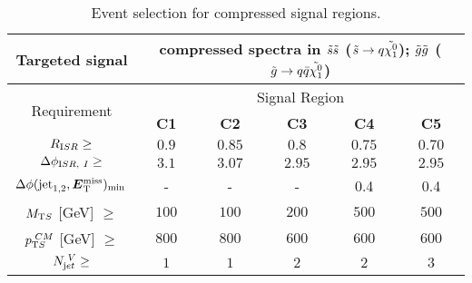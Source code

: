 {\begin{table}[tbp]
\begin{tabular}{|c|c|c|c|c|c|}
\hline
       Targeted signal & \multicolumn{5}{c|}{ compressed spectra in $\tilde{s}\tilde{s}$ ($\tilde{s} \rightarrow q \tilde{\chi^0_1}$); $\tilde{g}\tilde{g}$ ($\tilde{g} \rightarrow q\bar{q} \tilde{\chi^0_1}$) } \\
       \hline \hline
      \multirow{2}{*}{Requirement}                                             & \multicolumn{5}{c|}{Signal Region}                                                           \\
 \cline{2-6}                                                                   & \textbf{ C1} & \textbf{ C2} & \textbf{ C3} & \textbf{ C4} & \textbf{ C5} \\
\hline
$R_{\textrm ISR} \geq $                                                        & $ 0.9$           & $ 0.85$          & $ 0.8$           & $ 0.75$          & $ 0.70$          \\ \hline
$ \Delta\phi_{\textrm ISR,~I} \geq$                                            & $ 3.1$           & $ 3.07$          & $ 2.95$          & $ 2.95$          & $ 2.95$          \\ \hline
$\Delta\phi(\textrm{jet}_{\textrm 1,2},\bm{E}\mathrm{^{miss}_T})_{\text{min}} \> $ & -                & -                & -                & 0.4              & 0.4              \\ \hline
$M_{\textrm T S}$ [GeV] $\geq$                                                 & $ 100$           & $ 100$           & $ 200$           & $ 500$           & $ 500$           \\ \hline
$p_{\textrm T S}^{\textrm ~CM}$ [GeV]  $\ge$                                   & $ 800$           & $ 800$           & $ 600$           & $ 600$           & $ 600$           \\ \hline
$N_{\textrm jet}^{\textrm ~V} \geq$                                            & $ 1$             & $ 1$             & $ 2$             & $ 2$             & $ 3$             \\
\hline

\end{tabular}
\caption{Event selection for compressed signal regions.
\label{tab:compressed_srs}}
\end{table}
}

